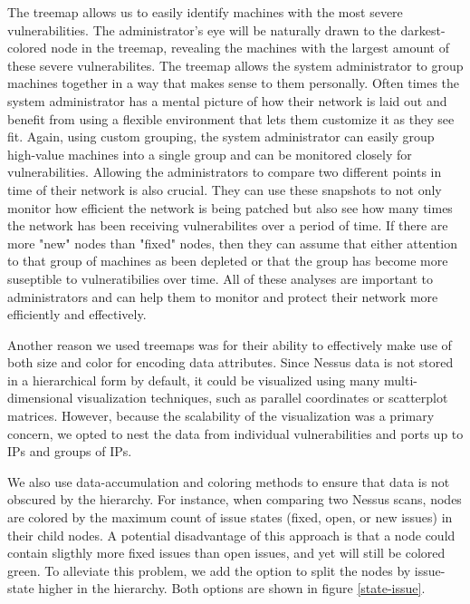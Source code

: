\documentclass{acm_proc_article-sp}
\begin{document}
The treemap allows us to easily identify machines with the most severe vulnerabilities. The administrator's eye will be naturally drawn to the darkest-colored node in the treemap, revealing the machines with the largest amount of these severe vulnerabilites. The treemap allows the system administrator to group machines together in a way that makes sense to them personally. Often times the system administrator has a mental picture of how their network is laid out and benefit from using a flexible environment that lets them customize it as they see fit. Again, using custom grouping, the system administrator can easily group high-value machines into a single group and can be monitored closely for vulnerabilities. Allowing the administrators to compare two different points in time of their network is also crucial. They can use these snapshots to not only monitor how efficient the network is being patched but also see how many times the network has been receiving vulnerabilites over a period of time. If there are more "new" nodes than "fixed" nodes, then they can assume that either attention to that group of machines as been depleted or that the group has become more suseptible to vulneratibilies over time. All of these analyses are important to administrators and can help them to monitor and protect their network more efficiently and effectively.

Another reason we used treemaps was for their ability to effectively make use of both size and color for encoding data attributes.
Since Nessus data is not stored in a hierarchical form by default, it could be visualized using many multi-dimensional visualization techniques, such as parallel coordinates or scatterplot matrices.
However, because the scalability of the visualization was a primary concern, we opted to nest the data from individual vulnerabilities and ports up to IPs and groups of IPs.

We also use data-accumulation and coloring methods to ensure that data is not obscured by the hierarchy.
For instance, when comparing two Nessus scans, nodes are colored by the maximum count of issue states (fixed, open, or new issues) in their child nodes.
A potential disadvantage of this approach is that a node could contain sligthly more fixed issues than open issues, and yet will still be colored green.
To alleviate this problem, we add the option to split the nodes by issue-state higher in the hierarchy.
Both options are shown in figure \ref{state-issue}.
\end{document}

